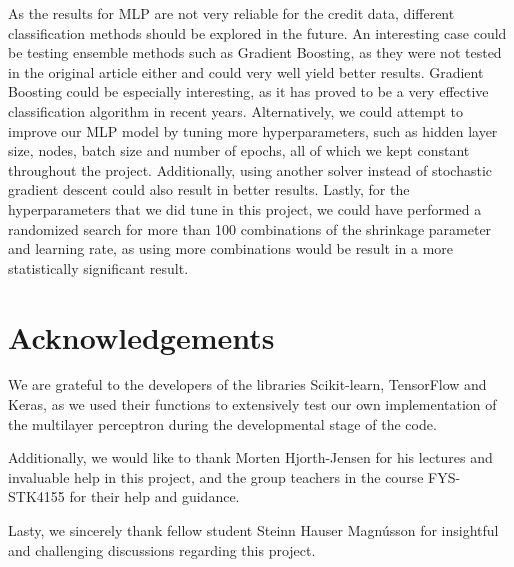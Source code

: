 \documentclass[a4paper, 11pt, twocolumn]{article}
\begin{document}
As the results for MLP are not very reliable for the credit data, different
classification methods should be explored in the future. An interesting case
could be testing ensemble methods such as Gradient Boosting, as they were
not tested in the original article either \cite{origarticle} and could very well
yield better results. Gradient Boosting could be especially interesting, as it
has proved to be a very effective classification algorithm in recent years.
Alternatively, we could attempt to improve our MLP model by tuning more
hyperparameters, such as hidden layer size, nodes, batch size and number of
epochs, all of which we kept constant throughout the project. Additionally,
using another solver instead of stochastic gradient descent could also result in
better results. Lastly, for the hyperparameters that we did tune in this project,
we could have performed a randomized search for more than 100 combinations of the
shrinkage parameter and learning rate, as using more combinations would be result
in a more statistically significant result. 


\section*{Acknowledgements}

We are grateful to the developers of the libraries Scikit-learn, TensorFlow and 
Keras, as we used their functions to extensively test our own implementation of 
the multilayer perceptron during the developmental 
stage of the code. 

Additionally, we would like to thank Morten Hjorth-Jensen for his lectures and 
invaluable help in this project, and the group teachers in the course FYS-STK4155 
for their help and guidance. 

Lasty, we sincerely thank fellow student Steinn Hauser Magnússon for insightful 
and challenging discussions regarding this project. 

%

\end{document}
